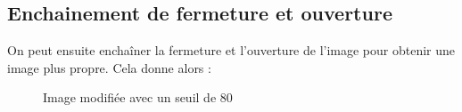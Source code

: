 \documentclass[french,a4paper,10pt]{article}
\begin{document}
	\newpage
	\subsection{Enchainement de fermeture et ouverture}\label{subsec:3.3}

	On peut ensuite enchaîner la fermeture et l'ouverture de l'image pour obtenir une image plus propre.
	Cela donne alors :
	\begin{figure}[!htb]
		\begin{minipage}{0.30\textwidth}
			\centering
			\caption{Image modifiée avec un seuil de 80}\label{Fig:test-grey-08-6}
		\end{minipage}\hfill
		\begin{minipage}{0.30\textwidth}
			\centering

\end{minipage}
\end{figure}
\end{document}
